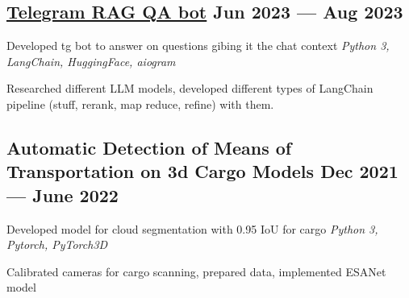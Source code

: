 
\subsection{{\href{https://github.com/MakArtKar/LLM_QA_doc_corpus}{Telegram RAG QA bot} \hfill Jun 2023 --- Aug 2023}}
\begin{zitemize}
\item[$\rightarrow$] Developed tg bot to answer on questions gibing it the chat context \hfill \textit{Python 3, LangChain, HuggingFace, aiogram}
\item Researched different LLM models, developed different types of LangChain pipeline (stuff, rerank, map reduce, refine) with them.
\end{zitemize}

\subsection{{Automatic Detection of Means of Transportation on 3d Cargo Models \hfill Dec 2021 --- June 2022}}
\begin{zitemize}
\item[$\rightarrow$] Developed model for cloud segmentation with 0.95 IoU for cargo \hfill \textit{Python 3, Pytorch, PyTorch3D}
\item Calibrated cameras for cargo scanning, prepared data, implemented ESANet model
\end{zitemize}


